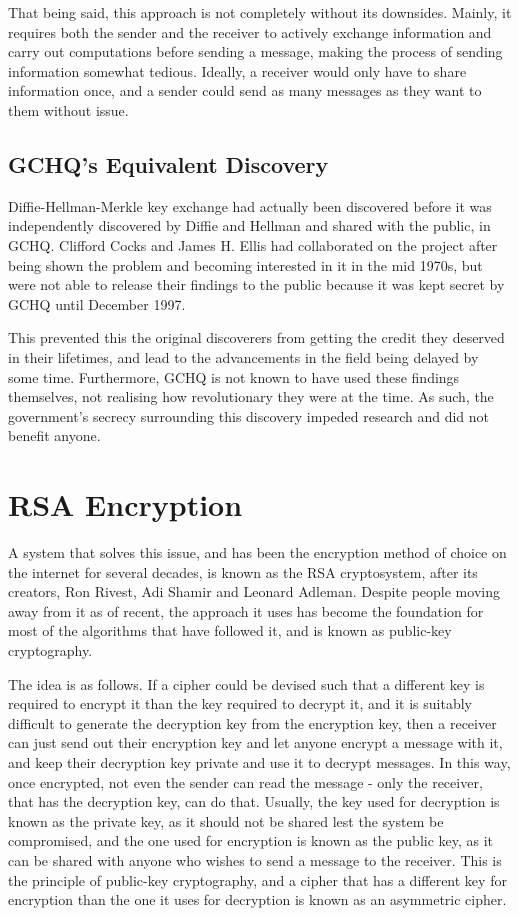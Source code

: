 \documentclass[a4paper,12pt]{report}
\begin{document}
That being said, this approach is not completely without its downsides. Mainly,
it requires both the sender and the receiver to actively exchange information
and carry out computations before sending a message, making the process of
sending information somewhat tedious. Ideally, a receiver would only have to
share information once, and a sender could send as many messages as they want to
them without issue.

    \subsection{GCHQ's Equivalent Discovery}
Diffie-Hellman-Merkle key exchange had actually been discovered before it was
independently discovered by Diffie and Hellman and shared with the public, in
GCHQ. Clifford Cocks and James H. Ellis had collaborated on the project after
being shown the problem and becoming interested in it in the mid 1970s, but were
not able to release their findings to the public because it was kept secret by
GCHQ until December 1997\cite{ellis}.

This prevented this the original discoverers from getting the credit they
deserved in their lifetimes, and lead to the advancements in the field being
delayed by some time. Furthermore, GCHQ is not known to have used these findings
themselves, not realising how revolutionary they were at the time. As such, the
government's secrecy surrounding this discovery impeded research and did not
benefit anyone.

  \section{RSA Encryption}
A system that solves this issue, and has been the encryption method of choice on
the internet for several decades, is known as the RSA cryptosystem, after its
creators, Ron Rivest, Adi Shamir and Leonard Adleman\cite{rivestshamiradleman}.
Despite people moving away from it as of recent, the approach it uses has become
the foundation for most of the algorithms that have followed it, and is known as
public-key cryptography.

The idea is as follows. If a cipher could be devised such that a different key
is required to encrypt it than the key required to decrypt it, and it is
suitably difficult to generate the decryption key from the encryption key, then
a receiver can just send out their encryption key and let anyone encrypt a
message with it, and keep their decryption key private and use it to decrypt
messages. In this way, once encrypted, not even the sender can read the message
- only the receiver, that has the decryption key, can do that. Usually, the key
used for decryption is known as the private key, as it should not be shared lest
the system be compromised, and the one used for encryption is known as the
public key, as it can be shared with anyone who wishes to send a message to the
receiver. This is the principle of public-key cryptography, and a cipher that
has a different key for encryption than the one it uses for decryption is known
as an asymmetric cipher.
\end{document}
